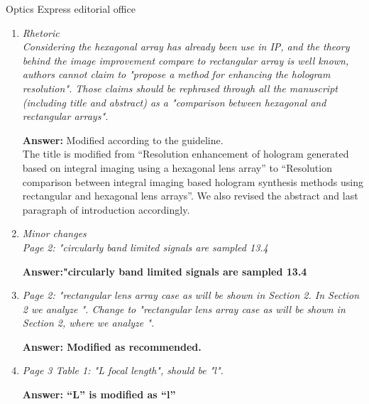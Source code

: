 \documentclass[a4paper,11pt]{letter}
\begin{document}
\begin{letter}{Optics Express editorial office}
\begin{enumerate}
\bigskip
\textbf{Answer:}
As the reviewer pointed out, the point spread function is much more general measure for the image quality in the imaging optics. But the hologram synthesis process using integral imaging is not a direct imaging optical process but contains a number of digital signal processing, which makes it not easy to find a point spread function for the process. Hence we used PSNR and NCC instead of point spread function for the image quality metric. They do not give full information on the overall imaging performance of the system. But at least for specific resultant images, they can give quantitative values for the image quality.

\item \textit{Rhetoric  \\
Considering the hexagonal array has already been use in IP, and the theory behind the image improvement compare to rectangular array is well known, authors cannot claim to "propose a method for enhancing the hologram resolution". Those claims should be rephrased through all the manuscript (including title and abstract) as a "comparison between hexagonal and rectangular arrays".}

\bigskip
\textbf{Answer:} 
Modified according to the guideline.\\
The title is modified from “Resolution enhancement of hologram generated based on integral imaging using a hexagonal lens array” to “Resolution comparison between integral imaging based hologram synthesis methods using rectangular and hexagonal lens arrays”.
We also revised the abstract and last paragraph of introduction accordingly.


\item \textit{Minor changes  \\
Page 2: "circularly band limited signals are sampled 13.4}

\bigskip
\textbf{Answer:"circularly band limited signals are sampled 13.4} 

\item \textit{Page 2: "rectangular lens array case as will be shown in Section 2. In Section 2 we analyze ". Change to "rectangular lens array case as will be shown in Section 2, where we analyze ". }

\bigskip
\textbf{Answer: Modified as recommended.} 

\item \textit{Page 3 Table 1: "L focal length", should be "l".}

\bigskip
\textbf{Answer: “L” is modified as “l”} 


\end{enumerate}
\end{letter}
\end{document}
